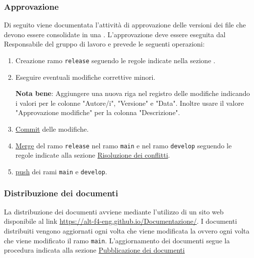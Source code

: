 \subsubsection{Approvazione}
Di seguito viene documentata l'attività di approvazione delle versioni dei file che devono essere consolidate in una .
L'approvazione deve essere eseguita dal Responsabile del gruppo di lavoro e prevede le seguenti operazioni:
\begin{enumerate}
    \item Creazione ramo \texttt{release} seguendo le regole indicate nella sezione \hyperref[subpar:strategia_di_branching_documenti]{}.
    \item Eseguire eventuali modifiche correttive minori.
    
    \textbf{Nota bene}: Aggiungere una nuova riga nel registro delle modifiche indicando i valori per le colonne "Autore/i", "Versione" e "Data".
    Inoltre usare il valore "Approvazione modifiche" per la colonna "Descrizione".

    \item \hyperref[subpar:commit]{Commit} delle modifiche.
    \item \hyperref[subpar:merge]{Merge} del ramo \texttt{release} nel ramo \texttt{main} e nel ramo \texttt{develop} seguendo le regole indicate alla sezione \hyperref[subpar:risoluzione_dei_conflitti]{Risoluzione dei conflitti}.
    \item \hyperref[subpar:push]{push} dei rami \texttt{main} e \texttt{develop}.
\end{enumerate}

\subsubsection{Distribuzione dei documenti}
La distribuzione dei documenti avviene mediante l'utilizzo di un sito web disponibile al link \href{https://alt-f4-eng.github.io/Documentazione/}{https://alt-f4-eng.github.io/Documentazione/}.
I documenti distribuiti vengono aggiornati ogni volta che viene modificata la  ovvero ogni volta che viene modificato il ramo \texttt{main}.
L'aggiornamento dei documenti segue la procedura indicata alla sezione \hyperref[par:pubblicazione_documenti]{Pubblicazione dei documenti}